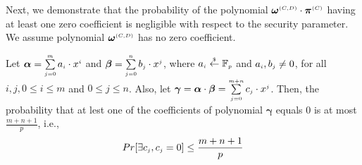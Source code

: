 Next, we demonstrate that the probability of the polynomial  $\bm\omega^{\scriptscriptstyle (C,D)}\cdot \bm\pi^{\scriptscriptstyle  {  {(C)}}}$ having at least one zero coefficient is negligible with respect to the security parameter. We assume polynomial $\bm\omega^{\scriptscriptstyle (C,D)}$  has no zero coefficient. 



\begin{theorem}\label{theorem::zero-coeff-in-product}
Let  $\bm\alpha=\sum\limits_{\scriptscriptstyle j=0}^{\scriptscriptstyle m}a_{\scriptscriptstyle  i} \cdot x^{\scriptscriptstyle i}$ and  $\bm\beta=\sum\limits_{\scriptscriptstyle j=0}^{\scriptscriptstyle n}b_{\scriptscriptstyle  j} \cdot x^{\scriptscriptstyle j}$,  where $a_{\scriptscriptstyle i}\stackrel{\scriptscriptstyle\$}\leftarrow \mathbb{F}_{\scriptscriptstyle p}$ and $a_{\scriptscriptstyle i}, b_{\scriptscriptstyle j}\neq0$, for all $i,j, 0\leq i \leq m$ and $0\leq j \leq n$. Also, let $\bm\gamma=\bm\alpha\cdot\bm\beta=\sum\limits_{\scriptscriptstyle j=0}^{\scriptscriptstyle m+n}c_{\scriptscriptstyle  j} \cdot x^{\scriptscriptstyle j}$. Then, the probability that at lest one of the coefficients of polynomial $\bm\gamma$ equals $0$ is at most $\frac{m+n+1}{p}$, i.e., 
%
$$Pr[\exists c_{\scriptscriptstyle j}, c_{\scriptscriptstyle j}=0]\leq \frac{m+n+1}{p}$$
%
\end{theorem}



